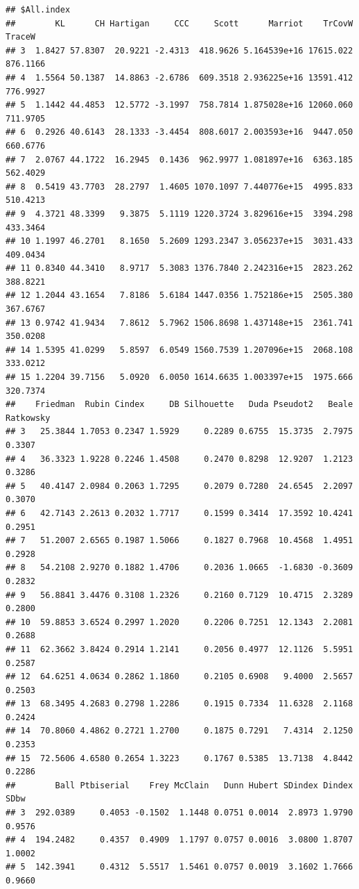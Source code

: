 \documentclass[
]{article}
\begin{document}
\begin{verbatim}
## $All.index
##        KL      CH Hartigan     CCC     Scott      Marriot    TrCovW   TraceW
## 3  1.8427 57.8307  20.9221 -2.4313  418.9626 5.164539e+16 17615.022 876.1166
## 4  1.5564 50.1387  14.8863 -2.6786  609.3518 2.936225e+16 13591.412 776.9927
## 5  1.1442 44.4853  12.5772 -3.1997  758.7814 1.875028e+16 12060.060 711.9705
## 6  0.2926 40.6143  28.1333 -3.4454  808.6017 2.003593e+16  9447.050 660.6776
## 7  2.0767 44.1722  16.2945  0.1436  962.9977 1.081897e+16  6363.185 562.4029
## 8  0.5419 43.7703  28.2797  1.4605 1070.1097 7.440776e+15  4995.833 510.4213
## 9  4.3721 48.3399   9.3875  5.1119 1220.3724 3.829616e+15  3394.298 433.3464
## 10 1.1997 46.2701   8.1650  5.2609 1293.2347 3.056237e+15  3031.433 409.0434
## 11 0.8340 44.3410   8.9717  5.3083 1376.7840 2.242316e+15  2823.262 388.8221
## 12 1.2044 43.1654   7.8186  5.6184 1447.0356 1.752186e+15  2505.380 367.6767
## 13 0.9742 41.9434   7.8612  5.7962 1506.8698 1.437148e+15  2361.741 350.0208
## 14 1.5395 41.0299   5.8597  6.0549 1560.7539 1.207096e+15  2068.108 333.0212
## 15 1.2204 39.7156   5.0920  6.0050 1614.6635 1.003397e+15  1975.666 320.7374
##    Friedman  Rubin Cindex     DB Silhouette   Duda Pseudot2   Beale Ratkowsky
## 3   25.3844 1.7053 0.2347 1.5929     0.2289 0.6755  15.3735  2.7975    0.3307
## 4   36.3323 1.9228 0.2246 1.4508     0.2470 0.8298  12.9207  1.2123    0.3286
## 5   40.4147 2.0984 0.2063 1.7295     0.2079 0.7280  24.6545  2.2097    0.3070
## 6   42.7143 2.2613 0.2032 1.7717     0.1599 0.3414  17.3592 10.4241    0.2951
## 7   51.2007 2.6565 0.1987 1.5066     0.1827 0.7968  10.4568  1.4951    0.2928
## 8   54.2108 2.9270 0.1882 1.4706     0.2036 1.0665  -1.6830 -0.3609    0.2832
## 9   56.8841 3.4476 0.3108 1.2326     0.2160 0.7129  10.4715  2.3289    0.2800
## 10  59.8853 3.6524 0.2997 1.2020     0.2206 0.7251  12.1343  2.2081    0.2688
## 11  62.3662 3.8424 0.2914 1.2141     0.2056 0.4977  12.1126  5.5951    0.2587
## 12  64.6251 4.0634 0.2862 1.1860     0.2105 0.6908   9.4000  2.5657    0.2503
## 13  68.3495 4.2683 0.2798 1.2286     0.1915 0.7334  11.6328  2.1168    0.2424
## 14  70.8060 4.4862 0.2721 1.2700     0.1875 0.7291   7.4314  2.1250    0.2353
## 15  72.5606 4.6580 0.2654 1.3223     0.1767 0.5385  13.7138  4.8442    0.2286
##        Ball Ptbiserial    Frey McClain   Dunn Hubert SDindex Dindex   SDbw
## 3  292.0389     0.4053 -0.1502  1.1448 0.0751 0.0014  2.8973 1.9790 0.9576
## 4  194.2482     0.4357  0.4909  1.1797 0.0757 0.0016  3.0800 1.8707 1.0002
## 5  142.3941     0.4312  5.5517  1.5461 0.0757 0.0019  3.1602 1.7666 0.9660

\end{verbatim}
\end{document}
